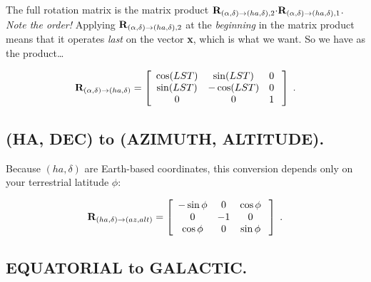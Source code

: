 \noindent The full rotation matrix is the matrix product ${\bf
R}_{(\alpha, \delta) \rightarrow (ha, \delta),2} {\bf \cdot} {\bf
R}_{(\alpha, \delta) \rightarrow (ha, \delta), 1}$.  {\it Note the
order!} Applying ${\bf R}_{(\alpha, \delta) \rightarrow (ha, \delta),2}$
at the {\it beginning} in the matrix product means that it operates {\it
last} on the vector {\bf x}, which is what we want.  So we have as the
product\dots

\begin{eqnarray} 
{\bf R}_{(\alpha, \delta) \rightarrow (ha, \delta)} = \left[ 
\begin{array}{ccc} 
    \cos(LST) & \sin(LST) &  0 \\
    \sin(LST) & -\cos(LST) &  0 \\
            0 &  0        &  1 \\
\end{array} 
\; \right] \; .
\end{eqnarray} 

\subsection {(HA, DEC) to (AZIMUTH, ALTITUDE).}

	Because $(ha, \delta)$ are Earth-based coordinates, this
conversion depends only on your terrestrial latitude $\phi$:

\begin{eqnarray} 
{\bf R}_{(ha, \delta) \rightarrow (az, alt)} = \left[ 
\begin{array}{ccc} 
-\sin \phi &    0    & \cos \phi \\ 
      0    &   -1    &    0      \\ 
 \cos \phi &    0    & \sin \phi \\ 
\end{array} 
\; \right] \; .
\end{eqnarray} 

\subsection {EQUATORIAL to GALACTIC.}


